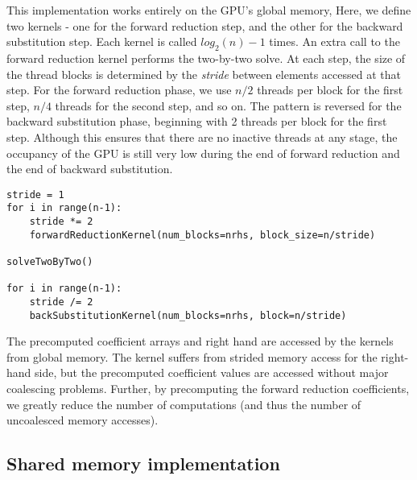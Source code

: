 This implementation works entirely on the GPU's global memory,
Here, we define two kernels - one for the forward reduction step,
and the other for the backward substitution step.
Each kernel is called $log_2(n)-1$ times.
An extra call to the
forward reduction kernel performs
the two-by-two solve.
At each step,
the size of the thread blocks is determined by the \emph{stride}
between elements accessed at that step.
For the forward reduction phase,
we use $n/2$ threads per block for the first step,
$n/4$ threads for the second step, and so on.
The pattern is reversed for the backward substitution phase,
beginning with 2 threads per block for the first step.
Although this ensures that there are no inactive threads
at any stage,
the occupancy of the GPU is still very low
during the end of forward reduction and the end of backward substitution.

\begin{listing}[H]
\begin{verbatim}
stride = 1
for i in range(n-1):
    stride *= 2
    forwardReductionKernel(num_blocks=nrhs, block_size=n/stride)

solveTwoByTwo()

for i in range(n-1):
    stride /= 2
    backSubstitutionKernel(num_blocks=nrhs, block=n/stride)
\end{verbatim}
\end{listing}

The precomputed coefficient arrays and right hand
are accessed by the kernels from global memory.
The kernel suffers from
strided memory access for the right-hand side,
but the precomputed coefficient values are accessed
without major coalescing problems.
Further, by precomputing the forward reduction coefficients,
we greatly reduce the number of computations
(and thus the number of uncoalesced memory accesses).

\subsection{Shared memory implementation}

